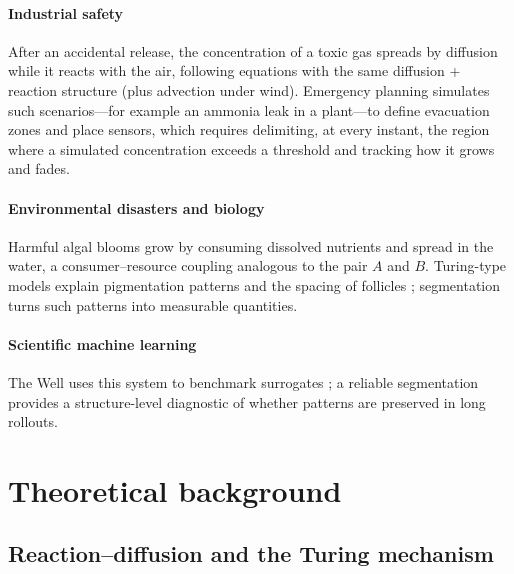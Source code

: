 \documentclass[preprint,12pt,authoryear]{elsarticle}
\begin{document}
\paragraph{Industrial safety} After an accidental release, the concentration of a toxic gas spreads by diffusion while it reacts with the air, following equations with the same diffusion + reaction structure (plus advection under wind). Emergency planning simulates such scenarios---for example an ammonia leak in a plant---to define evacuation zones and place sensors, which requires delimiting, at every instant, the region where a simulated concentration exceeds a threshold and tracking how it grows and fades.

\paragraph{Environmental disasters and biology} Harmful algal blooms grow by consuming dissolved nutrients and spread in the water, a consumer--resource coupling analogous to the pair $A$ and $B$. Turing-type models explain pigmentation patterns and the spacing of follicles \citep{kondo2010,murray2003}; segmentation turns such patterns into measurable quantities.

\paragraph{Scientific machine learning} The Well uses this system to benchmark surrogates \citep{ohana2024well}; a reliable segmentation provides a structure-level diagnostic of whether patterns are preserved in long rollouts.

\section{Theoretical background}
\label{sec:theory}

\subsection{Reaction--diffusion and the Turing mechanism}
\end{document}
